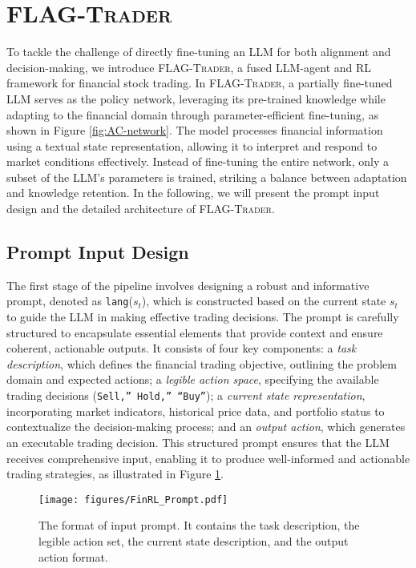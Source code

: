 \section{\textsc{FLAG-Trader}}
To tackle the challenge of directly fine-tuning an LLM for both alignment and decision-making, we introduce \textsc{FLAG-Trader}, a fused LLM-agent and RL framework for financial stock trading. In \textsc{FLAG-Trader}, a partially fine-tuned LLM serves as the policy network, leveraging its pre-trained knowledge while adapting to the financial domain through parameter-efficient fine-tuning, as shown in Figure \ref{fig:AC-network}. The model processes financial information using a textual state representation, allowing it to interpret and respond to market conditions effectively. Instead of fine-tuning the entire network, only a subset of the LLM’s parameters is trained, striking a balance between adaptation and knowledge retention. In the following, we will present the prompt input design and the detailed architecture of \textsc{FLAG-Trader}.







\subsection{Prompt Input Design}

The first stage of the pipeline involves designing a robust and informative prompt, denoted as \texttt{lang}($s_t$), which is constructed based on the current state 
$s_t$ to guide the LLM in making effective trading decisions. The prompt is carefully structured to encapsulate essential elements that provide context and ensure coherent, actionable outputs. It consists of four key components: a \emph{task description}, which defines the financial trading objective, outlining the problem domain and expected actions; a \emph{legible action space}, specifying the available trading decisions (\texttt{Sell,'' Hold,'' ``Buy''}); a \emph{current state representation}, incorporating market indicators, historical price data, and portfolio status to contextualize the decision-making process; and an \emph{output action}, which generates an executable trading decision. This structured prompt ensures that the LLM receives comprehensive input, enabling it to produce well-informed and actionable trading strategies, as illustrated in Figure \ref{fig:prompt}.




\begin{figure}[h]
    \centering
    \texttt{[image: figures/FinRL\_Prompt.pdf]}
    \caption{The format of input prompt. It contains the task description, the legible action set, the current state description, and the output action format.}
    \label{fig:prompt}
    \vspace{-0.2cm}
\end{figure}

